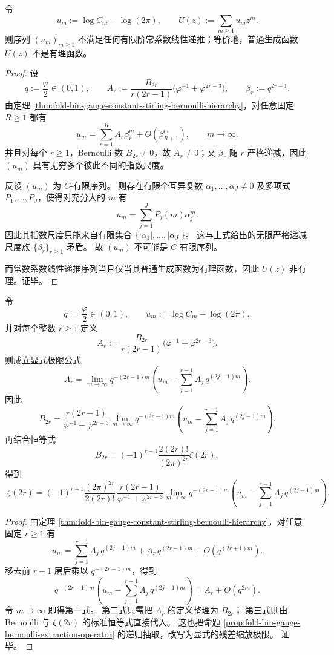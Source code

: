 \begin{theorem}\label{thm:fold-bin-gauge-constant-not-c-finite}
令
\[
u_m:=\log C_m-\log(2\pi),
\qquad
U(z):=\sum_{m\ge 1}u_m z^m.
\]
则序列 \((u_m)_{m\ge 1}\) 不满足任何有限阶常系数线性递推；等价地，普通生成函数 \(U(z)\) 不是有理函数。
\end{theorem}
\begin{proof}
设
\[
q:=\frac{\varphi}{2}\in(0,1),
\qquad
A_r:=\frac{B_{2r}}{r(2r-1)}\bigl(\varphi^{-1}+\varphi^{2r-3}\bigr),
\qquad
\beta_r:=q^{2r-1}.
\]
由定理 \ref{thm:fold-bin-gauge-constant-stirling-bernoulli-hierarchy}，对任意固定 \(R\ge 1\) 都有
\[
u_m=\sum_{r=1}^{R}A_r\beta_r^m+O(\beta_{R+1}^m),
\qquad m\to\infty.
\]
并且对每个 \(r\ge 1\)，Bernoulli 数 \(B_{2r}\neq 0\)，故 \(A_r\neq 0\)；又 \(\beta_r\) 随 \(r\) 严格递减，因此 \((u_m)\) 具有无穷多个彼此不同的指数尺度。

反设 \((u_m)\) 为 \(C\)-有限序列。
则存在有限个互异复数 \(\alpha_1,\dots,\alpha_J\neq 0\) 及多项式 \(P_1,\dots,P_J\)，使得对充分大的 \(m\) 有
\[
u_m=\sum_{j=1}^{J}P_j(m)\alpha_j^m.
\]
因此其指数尺度只能来自有限集合 \(\{|\alpha_1|,\dots,|\alpha_J|\}\)。
这与上式给出的无限严格递减尺度族 \(\{\beta_r\}_{r\ge 1}\) 矛盾。
故 \((u_m)\) 不可能是 \(C\)-有限序列。

而常数系数线性递推序列当且仅当其普通生成函数为有理函数，因此 \(U(z)\) 非有理。证毕。
\end{proof}

\begin{theorem}\label{thm:fold-bin-gauge-constant-zeta-even-recovery-limit}
令
\[
q:=\frac{\varphi}{2}\in(0,1),
\qquad
u_m:=\log C_m-\log(2\pi),
\]
并对每个整数 \(r\ge 1\) 定义
\[
A_r:=\frac{B_{2r}}{r(2r-1)}\bigl(\varphi^{-1}+\varphi^{2r-3}\bigr).
\]
则成立显式极限公式
\[
\boxed{\;
A_r=
\lim_{m\to\infty}
q^{-(2r-1)m}
\left(
u_m-\sum_{j=1}^{r-1}A_j\,q^{(2j-1)m}
\right).\;}
\]
因此
\[
\boxed{\;
B_{2r}
=
\frac{r(2r-1)}{\varphi^{-1}+\varphi^{2r-3}}
\lim_{m\to\infty}
q^{-(2r-1)m}
\left(
u_m-\sum_{j=1}^{r-1}A_j\,q^{(2j-1)m}
\right).\;}
\]
再结合恒等式
\[
B_{2r}=(-1)^{r-1}\frac{2(2r)!}{(2\pi)^{2r}}\zeta(2r),
\]
得到
\[
\boxed{\;
\zeta(2r)
=
(-1)^{r-1}\frac{(2\pi)^{2r}}{2(2r)!}\,
\frac{r(2r-1)}{\varphi^{-1}+\varphi^{2r-3}}
\lim_{m\to\infty}
q^{-(2r-1)m}
\left(
u_m-\sum_{j=1}^{r-1}A_j\,q^{(2j-1)m}
\right).\;}
\]
\end{theorem}
\begin{proof}
由定理 \ref{thm:fold-bin-gauge-constant-stirling-bernoulli-hierarchy}，对任意固定 \(r\ge 1\) 有
\[
u_m=\sum_{j=1}^{r-1}A_j\,q^{(2j-1)m}+A_r\,q^{(2r-1)m}+O(q^{(2r+1)m}).
\]
移去前 \(r-1\) 层后乘以 \(q^{-(2r-1)m}\)，得到
\[
q^{-(2r-1)m}
\left(
u_m-\sum_{j=1}^{r-1}A_j\,q^{(2j-1)m}
\right)
=A_r+O(q^{2m}).
\]
令 \(m\to\infty\) 即得第一式。
第二式只需把 \(A_r\) 的定义整理为 \(B_{2r}\)；
第三式则由 Bernoulli 与 \(\zeta(2r)\) 的标准恒等式直接代入。
这也把命题 \ref{prop:fold-bin-gauge-bernoulli-extraction-operator} 的递归抽取，改写为显式的残差缩放极限。
证毕。
\end{proof}
